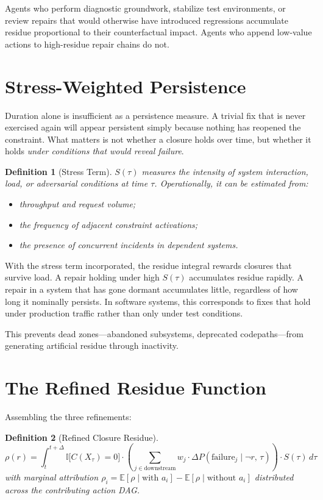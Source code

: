 \documentclass[12pt]{article}
\newtheorem{definition}{Definition}
\begin{document}
Agents who perform diagnostic groundwork, stabilize test environments,
or review repairs that would otherwise have introduced regressions
accumulate residue proportional to their counterfactual impact.
Agents who append low-value actions to high-residue repair chains do
not.

\section{Stress-Weighted Persistence}

Duration alone is insufficient as a persistence measure. A trivial fix
that is never exercised again will appear persistent simply because
nothing has reopened the constraint. What matters is not whether a
closure holds over time, but whether it holds \emph{under conditions
that would reveal failure}.

\begin{definition}[Stress Term]
$S(\tau)$ measures the intensity of system interaction, load, or
adversarial conditions at time $\tau$. Operationally, it can be
estimated from:
\begin{itemize}
  \item throughput and request volume;
  \item the frequency of adjacent constraint activations;
  \item the presence of concurrent incidents in dependent systems.
\end{itemize}
\end{definition}

With the stress term incorporated, the residue integral rewards closures
that survive load. A repair holding under high $S(\tau)$ accumulates
residue rapidly. A repair in a system that has gone dormant accumulates
little, regardless of how long it nominally persists. In software
systems, this corresponds to fixes that hold under production traffic
rather than only under test conditions.

This prevents dead zones---abandoned subsystems, deprecated
codepaths---from generating artificial residue through inactivity.

\section{The Refined Residue Function}

Assembling the three refinements:

\begin{definition}[Refined Closure Residue]
\[
  \rho(r) = \int_{t}^{t+\Delta}
    \mathbb{I}\bigl[C(X_\tau) = 0\bigr]
    \cdot
    \left(
      \sum_{j \in \mathrm{downstream}}
        w_j \cdot \Delta P\!\left(\mathrm{failure}_j \mid \neg r,\, \tau\right)
    \right)
    \cdot S(\tau)
  \, d\tau
\]
with marginal attribution $\rho_i =
\mathbb{E}[\rho \mid \text{with } a_i] -
\mathbb{E}[\rho \mid \text{without } a_i]$
distributed across the contributing action DAG.
\end{definition}
\end{document}
